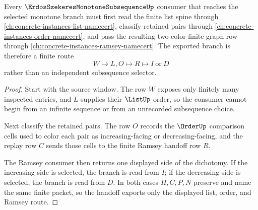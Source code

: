 \begin{theorem}
\label{thm:erdos-szekeres-monotone-subsequence-ramsey-handoff}
Every $\ErdosSzekeresMonotoneSubsequenceUp$ consumer that reaches the selected monotone branch must first read the finite list spine through \autoref{ch:concrete-instances-list-namecert}, classify retained pairs through \autoref{ch:concrete-instances-order-namecert}, and pass the resulting two-color finite graph row through \autoref{ch:concrete-instances-ramsey-namecert}. The exported branch is therefore a finite route
$$
W \longmapsto L,O \longmapsto R \longmapsto I\ \mathrm{or}\ D
$$
rather than an independent subsequence selector.
\end{theorem}
\begin{proof}
Start with the source window. The row $W$ exposes only finitely many inspected entries, and $L$ supplies their $\ListUp$ order, so the consumer cannot begin from an infinite sequence or from an unrecorded subsequence choice.

Next classify the retained pairs. The row $O$ records the $\OrderUp$ comparison cells used to color each pair as increasing-facing or decreasing-facing, and the replay row $C$ sends those cells to the finite Ramsey handoff row $R$.

The Ramsey consumer then returns one displayed side of the dichotomy. If the increasing side is selected, the branch is read from $I$; if the decreasing side is selected, the branch is read from $D$. In both cases $H,C,P,N$ preserve and name the same finite packet, so the handoff exports only the displayed list, order, and Ramsey route.
\end{proof}



\begin{closurestatus}{\ErdosSzekeresMonotoneSubsequenceUp}
  \theoryclosure{\seedClosure}
  \formalstatus{\unformalizedV}
\end{closurestatus}
